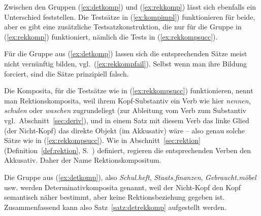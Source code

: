 Zwischen den Gruppen (\ref{ex:detkomp}) und (\ref{ex:rekkomp}) lässt sich ebenfalls ein Unterschied feststellen.
Die Testsätze in (\ref{ex:kompimpl}) funktionieren für beide, aber es gibt eine zusätzliche Testsatzkonstruktion, die nur für die Gruppe in (\ref{ex:rekkomp}) funktioniert, nämlich die Tests in (\ref{ex:rekkompsucc}).

\begin{exe}
  \ex\label{ex:rekkompsucc}
  \begin{xlist}
  \end{xlist}
\end{exe}

Für die Gruppe aus (\ref{ex:detkomp}) lassen sich die entsprechenden Sätze meist nicht vernünftig bilden, vgl.\ (\ref{ex:rekkompfail}).
Selbst wenn man ihre Bildung forciert, sind die Sätze prinzipiell falsch.
  
\begin{exe}
  \ex\label{ex:rekkompfail}
  \begin{xlist}
  \end{xlist}
\end{exe}

Die Komposita, für die Testsätze wie in (\ref{ex:rekkompsucc}) funktionieren, nennt man Rektionskomposita, weil ihrem Kopf-Substantiv ein Verb wie hier \textit{nennen}, \textit{schulen} oder \textit{waschen} zugrundeliegt (zur Ableitung vom Verb zum Substantiv vgl.\ Abschnitt~\ref{sec:deriv}), und in einem Satz mit diesem Verb das linke Glied (der Nicht-Kopf) das direkte Objekt (im Akkusativ) wäre -- also genau solche Sätze wie in (\ref{ex:rekkompsucc}).
Wie in Abschnitt~\ref{sec:rektion} (Definition~\ref{def:rektion}, S.~\pageref{def:rektion}) definiert, regieren die entsprechenden Verben den Akkusativ.
Daher der Name Rektionskompositum.

Die Gruppe aus (\ref{ex:detkomp}), also \textit{Schul.heft}, \textit{Staats.finanzen}, \textit{Gebraucht.möbel} usw. werden Determinativkomposita genannt, weil der Nicht-Kopf den Kopf semantisch näher bestimmt, aber keine Rektionsbeziehung gegeben ist.
Zusammenfassend kann also Satz~\ref{satz:detrekkomp} aufgestellt werden.

